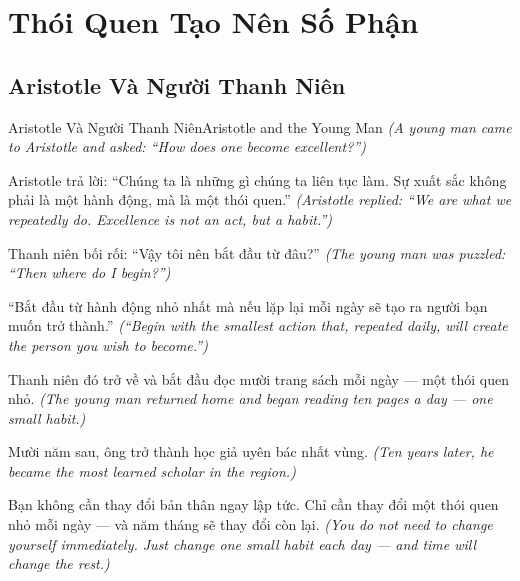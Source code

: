 \chapter{Thói Quen Tạo Nên Số Phận}

\section{Aristotle Và Người Thanh Niên}
\begin{truyen}{Aristotle Và Người Thanh Niên}{Aristotle and the Young Man}
\textit{(A young man came to Aristotle and asked: ``How does one become excellent?'')}

Aristotle trả lời: ``Chúng ta là những gì chúng ta liên tục làm. Sự xuất sắc không phải là một hành động, mà là một thói quen.''
\textit{(Aristotle replied: ``We are what we repeatedly do. Excellence is not an act, but a habit.'')}

Thanh niên bối rối: ``Vậy tôi nên bắt đầu từ đâu?''
\textit{(The young man was puzzled: ``Then where do I begin?'')}

``Bắt đầu từ hành động nhỏ nhất mà nếu lặp lại mỗi ngày sẽ tạo ra người bạn muốn trở thành.''
\textit{(``Begin with the smallest action that, repeated daily, will create the person you wish to become.'')}

Thanh niên đó trở về và bắt đầu đọc mười trang sách mỗi ngày — một thói quen nhỏ.
\textit{(The young man returned home and began reading ten pages a day — one small habit.)}

Mười năm sau, ông trở thành học giả uyên bác nhất vùng.
\textit{(Ten years later, he became the most learned scholar in the region.)}

\end{truyen}

\begin{baihoc}
Bạn không cần thay đổi bản thân ngay lập tức. Chỉ cần thay đổi một thói quen nhỏ mỗi ngày — và năm tháng sẽ thay đổi còn lại.
\textit{(You do not need to change yourself immediately. Just change one small habit each day — and time will change the rest.)}
\end{baihoc}
\ngancach

